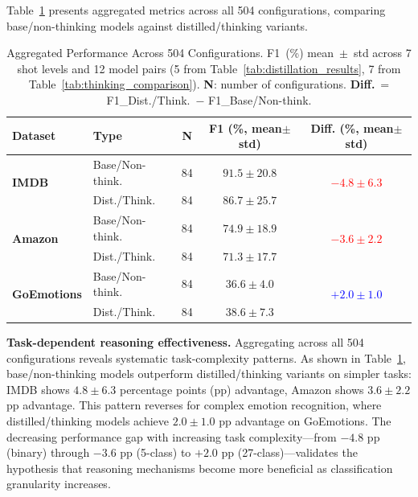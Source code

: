 \documentclass[runningheads]{llncs}
\begin{document}
Table~\ref{tab:aggregated_stats} presents aggregated metrics across all 504 configurations, comparing base/non-thinking models against distilled/thinking variants.

\begin{table}[t]
\centering
\caption{
Aggregated Performance Across 504 Configurations. F1~(\%) mean~$\pm$~std across 7 shot levels and 12 model pairs (5 from Table~\ref{tab:distillation_results}, 7 from Table~\ref{tab:thinking_comparison}). \textbf{N}: number of configurations. \textbf{Diff.}~= F1\_Dist./Think.\ $-$ F1\_Base/Non-think.
}
\label{tab:aggregated_stats}
\small
\begin{tabular}{llccc}
\toprule
\textbf{Dataset} & \textbf{Type} & \textbf{N} & \textbf{F1  (\%, mean$\pm$std)} & \textbf{Diff. (\%, mean$\pm$std)} \\
\midrule
\multirow{2}{*}{\textbf{IMDB}} 
    & Base/Non-think. & 84 & $91.5 \pm 20.8$ & \multirow{2}{*}{\textcolor{red}{$-4.8\pm6.3$}} \\
    & Dist./Think. & 84 & $86.7 \pm 25.7$ & \\
\midrule
\multirow{2}{*}{\textbf{Amazon}} 
    & Base/Non-think. & 84 & $74.9 \pm 18.9$ & \multirow{2}{*}{\textcolor{red}{$-3.6\pm2.2$}} \\
    & Dist./Think. & 84 & $71.3 \pm 17.7$ & \\
\midrule
\multirow{2}{*}{\textbf{GoEmotions}} 
    & Base/Non-think. & 84 & $36.6 \pm 4.0$ & \multirow{2}{*}{\textcolor{blue}{$+2.0\pm1.0$}} \\
    & Dist./Think. & 84 & $38.6 \pm 7.3$ & \\
\bottomrule
\end{tabular}
\end{table}

\textbf{Task-dependent reasoning effectiveness.} Aggregating across all 504 configurations reveals systematic task-complexity patterns. As shown in Table~\ref{tab:aggregated_stats}, base/non-thinking models outperform distilled/thinking variants on simpler tasks: IMDB shows $4.8\pm6.3$ percentage points (pp) advantage, Amazon shows $3.6\pm2.2$ pp advantage. This pattern reverses for complex emotion recognition, where distilled/thinking models achieve $2.0\pm1.0$ pp advantage on GoEmotions. The decreasing performance gap with increasing task complexity—from $-4.8$ pp (binary) through $-3.6$ pp (5-class) to $+2.0$ pp (27-class)—validates the hypothesis that reasoning mechanisms become more beneficial as classification granularity increases.
\end{document}
